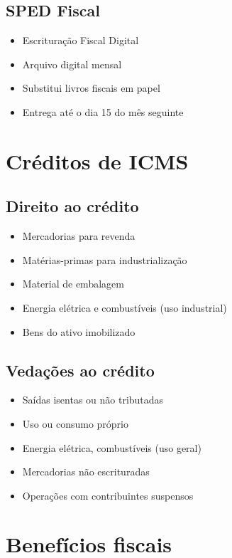 \documentclass[12pt,a4paper]{article}
\begin{document}
\subsection{SPED Fiscal}
\begin{itemize}
    \item Escrituração Fiscal Digital
    \item Arquivo digital mensal
    \item Substitui livros fiscais em papel
    \item Entrega até o dia 15 do mês seguinte
\end{itemize}

\section{Créditos de ICMS}

\subsection{Direito ao crédito}
\begin{itemize}
    \item Mercadorias para revenda
    \item Matérias-primas para industrialização
    \item Material de embalagem
    \item Energia elétrica e combustíveis (uso industrial)
    \item Bens do ativo imobilizado
\end{itemize}

\subsection{Vedações ao crédito}
\begin{itemize}
    \item Saídas isentas ou não tributadas
    \item Uso ou consumo próprio
    \item Energia elétrica, combustíveis (uso geral)
    \item Mercadorias não escrituradas
    \item Operações com contribuintes suspensos
\end{itemize}

\section{Benefícios fiscais}
\end{document}
